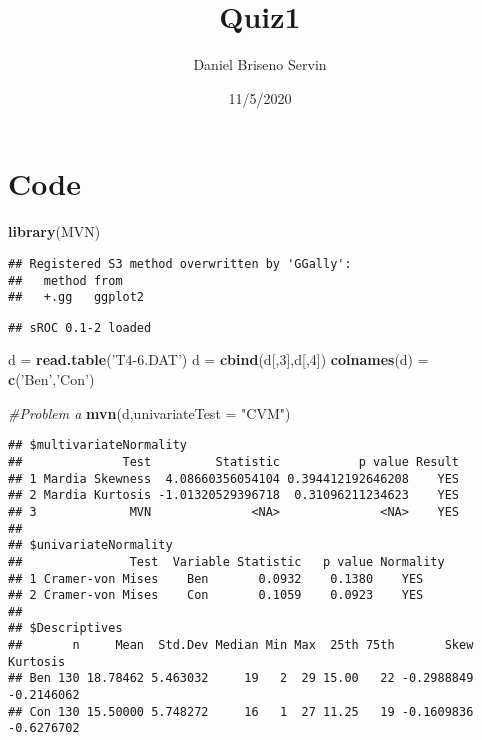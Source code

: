 \documentclass[
]{article}
\title{Quiz1}
\author{Daniel Briseno Servin}
\date{11/5/2020}
\newenvironment{Shaded}{\begin{snugshade}}{\end{snugshade}}
\newcommand{\CommentTok}[1]{\textcolor[rgb]{0.56,0.35,0.01}{\textit{#1}}}
\newcommand{\DataTypeTok}[1]{\textcolor[rgb]{0.13,0.29,0.53}{#1}}
\newcommand{\DecValTok}[1]{\textcolor[rgb]{0.00,0.00,0.81}{#1}}
\newcommand{\KeywordTok}[1]{\textcolor[rgb]{0.13,0.29,0.53}{\textbf{#1}}}
\newcommand{\NormalTok}[1]{#1}
\newcommand{\StringTok}[1]{\textcolor[rgb]{0.31,0.60,0.02}{#1}}
\begin{document}
\maketitle

\hypertarget{code}{%
\section{Code}\label{code}}

\begin{Shaded}
\begin{Highlighting}[]
\KeywordTok{library}\NormalTok{(MVN)}
\end{Highlighting}
\end{Shaded}

\begin{verbatim}
## Registered S3 method overwritten by 'GGally':
##   method from   
##   +.gg   ggplot2
\end{verbatim}

\begin{verbatim}
## sROC 0.1-2 loaded
\end{verbatim}

\begin{Shaded}
\begin{Highlighting}[]
\NormalTok{d =}\StringTok{ }\KeywordTok{read.table}\NormalTok{(}\StringTok{'T4-6.DAT'}\NormalTok{)}
\NormalTok{d =}\StringTok{ }\KeywordTok{cbind}\NormalTok{(d[,}\DecValTok{3}\NormalTok{],d[,}\DecValTok{4}\NormalTok{])}
\KeywordTok{colnames}\NormalTok{(d) =}\StringTok{ }\KeywordTok{c}\NormalTok{(}\StringTok{'Ben'}\NormalTok{,}\StringTok{'Con'}\NormalTok{)}

\CommentTok{#Problem a}
\KeywordTok{mvn}\NormalTok{(d,}\DataTypeTok{univariateTest =} \StringTok{"CVM"}\NormalTok{)}
\end{Highlighting}
\end{Shaded}

\begin{verbatim}
## $multivariateNormality
##              Test         Statistic           p value Result
## 1 Mardia Skewness  4.08660356054104 0.394412192646208    YES
## 2 Mardia Kurtosis -1.01320529396718  0.31096211234623    YES
## 3             MVN              <NA>              <NA>    YES
## 
## $univariateNormality
##               Test  Variable Statistic   p value Normality
## 1 Cramer-von Mises    Ben       0.0932    0.1380    YES   
## 2 Cramer-von Mises    Con       0.1059    0.0923    YES   
## 
## $Descriptives
##       n     Mean  Std.Dev Median Min Max  25th 75th       Skew   Kurtosis
## Ben 130 18.78462 5.463032     19   2  29 15.00   22 -0.2988849 -0.2146062
## Con 130 15.50000 5.748272     16   1  27 11.25   19 -0.1609836 -0.6276702
\end{verbatim}
\end{document}
